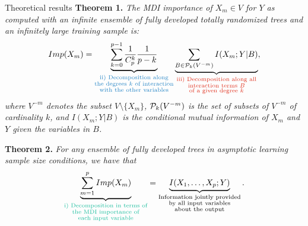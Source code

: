 \documentclass[final]{beamer}
\begin{document}
\begin{frame}{}
\begin{textblock}{0.32}
\begin{block}{Theoretical results \phantom{p}}
\textbf{Theorem 1.}
\textit{The MDI importance of $X_m \in V$ for $Y$ as computed
with an   infinite ensemble of fully developed totally randomized trees and an
infinitely large training sample is:
  \begin{equation*}
  Imp(X_m)=\underbrace{\sum_{k=0}^{p-1} \frac{1}{C_p^k} \frac{1}{p-k}}_{{\color{lightblue} \substack{\text{ii) Decomposition along}\\
                                                                                                     \text{the degrees $k$ of interaction}\\
                                                                                                     \text{with the other variables}}}}
           \underbrace{\sum_{B \in {\cal P}_k(V^{-m})} I(X_m;Y|B)}_{{\color{lightred} \substack{\text{iii) Decomposition along all}\\
                                                                                                \text{interaction terms $B$}\\
                                                                                                \text{of a given degree $k$}}}},
  \end{equation*}
\noindent where $V^{-m}$ denotes the subset $V \setminus \{X_m\}$, ${\cal
P}_k(V^{-m})$ is the set of subsets of  $V^{-m}$ of cardinality $k$, and
$I(X_m;Y|B)$ is the conditional mutual information of $X_{m}$ and $Y$ given the
variables in $B$.}

\vspace{0.3cm}

\textbf{Theorem 2.}
\textit{For any ensemble of fully developed trees in asymptotic learning sample size
conditions, we have that}
\begin{equation*}
\underbrace{\sum_{m=1}^{p}Imp(X_m)}_{{\color{lightgreen} \substack{\text{i) Decomposition in terms of}\\
                                                                   \text{the MDI importance of}\\
                                                                   \text{each input variable}}}} =
\underbrace{I(X_{1}, \ldots, X_{p} ; Y)}_{\substack{\text{Information jointly provided}\\
                                                    \text{by all input variables}\\
                                                    \text{about the output}}}.
\end{equation*}


\end{block}
\end{textblock}
\end{frame}
\end{document}
